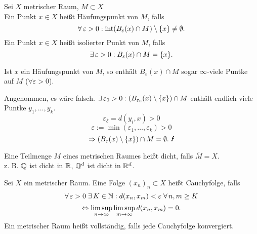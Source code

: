 \documentclass[../ana2.tex]{subfiles}
\begin{document}
\begin{defi}
    Sei \(X\) metrischer Raum, \( M \subset X \) \\
    Ein Punkt \( x \in X \) heißt Häufungspunkt von \(M\),
    falls 
    \[ \forall \varepsilon > 0: 
    \inner (B_\varepsilon(x) \cap M) \setminus \set{x} 
    \neq \emptyset. \]
    Ein Punkt \( x \in X \) heißt isolierter Punkt 
    von \( M \), falls 
    \[ \exists \varepsilon > 0: B_\varepsilon(x) \cap M 
    = \set{x}. \]
\end{defi}
\begin{bem}
    Ist \( x \) ein Häufungspunkt von \( M \), 
    so enthält \( B_\varepsilon(x) \cap M \) 
    sogar \( \infty \)-viele Puntke auf \( M \) 
    (\( \forall \varepsilon > 0 \)).
\end{bem}
\begin{bew}
    Angenommen, es wäre falsch.
    \( \exists \varepsilon_0 > 0: 
    (B_{\varepsilon_0}(x) \setminus \set{x}) \cap M \)
    enthält endlich viele Puntke \( y_1, \ldots, y_k \).
    \[ \varepsilon_\delta = d(y_i, x) > 0 \]
    \[ \varepsilon := 
    \min(\varepsilon_1, \dots, \varepsilon_k) > 0 \]
    \[ \Rightarrow (B_\varepsilon(x) \setminus \set{x})
    \cap M = \emptyset. \text{ \Lightning{}} \]
\end{bew}
\begin{defi}
    Eine Teilmenge \(M\) eines metrischen Raumes heißt
    dicht, falls \(\overline{M} = X\).\\
    z. B. \( \mathbb{Q} \) ist dicht in \( \mathbb{R} \), 
    \( \mathbb{Q}^d \) ist dicht in \( \mathbb{R}^d \).
\end{defi}
\begin{defi}[Cauchyfolge]
    Sei \( X \) ein metrischer Raum. 
    Eine Folge \( (x_n)_n \subset X \) heißt 
    Cauchyfolge, falls
    \[ \forall \varepsilon > 0 \; \exists K \in \N: 
    d(x_n, x_m) < \varepsilon \; \forall n,m \geq K \]
    \[ \Leftrightarrow \limsup\limits_{n\rightarrow\infty} \limsup\limits_{m\rightarrow\infty} 
    d(x_n, x_m) = 0. \]
    Ein metrischer Raum heißt vollständig, falls jede 
    Cauchyfolge konvergiert.
\end{defi}
\end{document}
